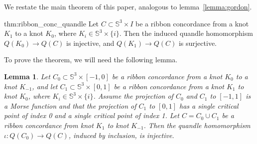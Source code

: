 \documentclass[a4paper,12pt]{amsart}
\numberwithin{equation}{section}
\theoremstyle{plain}
\newtheorem{lemma}[theorem]{Lemma}
\theoremstyle{definition}
\newcommand{\variable}{}
\newtheorem*{thm_again*}{Theorem~\ref{\variable}}
\newenvironment{thm_again}[2]
 {
  \renewcommand{\variable}{#1}
  \begin{thm_again*}[#2]
  }
 {
  \end{thm_again*}
  }
\newcommand{\s}{\mathbb{S}}
\begin{document}
We restate the main theorem of this paper, analogous to lemma~\ref{lemma:gordon}.


\begin{thm_again}{thm:ribbon_conc_quandle}{}
	Let $C\subset \s ^{3}\times I$ be a ribbon concordance from a knot $K_1$ to a knot $K_0$, where $K_{i}\in \s ^{3}\times \{i\}$. 
	Then the induced quandle homomorphism $Q(K_{0})\to Q(C)$ is injective, and $Q(K_{1})\to Q(C)$ is surjective.
\end{thm_again}


To prove the theorem, we will need the following lemma.


\begin{lemma}
	\label{lemma:ribon_conc_quandle}
	Let $C_0\subset \s ^{3}\times [-1, 0]$ be a ribbon concordance from a knot $K_{0}$ to a knot $K_{-1}$,
	and let $C_1 \subset \s^3 \times [0,1]$ be a ribbon concordance from a knot $K_1$ to knot $K_0$, 
	where $K_{i}\in \s ^{3}\times \{i\}$.
	Assume the projection of $C_0$ and $C_1$ to $[-1,1]$ is a Morse function and that the projection of $C_1$ to $[0,1]$ has a single critical point of index 0 and a single
	critical point of index 1. Let $C = C_0 \cup C_1$ be a ribbon concordance from knot $K_1$ to knot $K_{-1}$.
	Then the quandle homomorphism $\iota \colon Q(C_0)\to Q(C)$, induced by inclusion, is injective.
\end{lemma}
\end{document}
